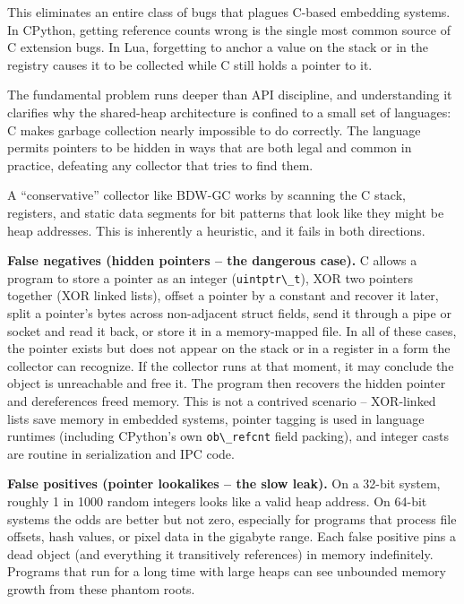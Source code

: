\documentclass[
  12pt,
]{report}
\newcommand{\passthrough}[1]{#1}
\begin{document}
This eliminates an entire class of bugs that plagues C-based embedding
systems. In CPython, getting reference counts wrong is the single most
common source of C extension bugs. In Lua, forgetting to anchor a value
on the stack or in the registry causes it to be collected while C still
holds a pointer to it.

The fundamental problem runs deeper than API discipline, and
understanding it clarifies why the shared-heap architecture is confined
to a small set of languages: C makes garbage collection nearly
impossible to do correctly. The language permits pointers to be hidden
in ways that are both legal and common in practice, defeating any
collector that tries to find them.

A ``conservative'' collector like BDW-GC works by scanning the C stack,
registers, and static data segments for bit patterns that look like they
might be heap addresses. This is inherently a heuristic, and it fails in
both directions.

\textbf{False negatives (hidden pointers -- the dangerous case).} C
allows a program to store a pointer as an integer
(\passthrough{\lstinline!uintptr\_t!}), XOR two pointers together (XOR
linked lists), offset a pointer by a constant and recover it later,
split a pointer's bytes across non-adjacent struct fields, send it
through a pipe or socket and read it back, or store it in a
memory-mapped file. In all of these cases, the pointer exists but does
not appear on the stack or in a register in a form the collector can
recognize. If the collector runs at that moment, it may conclude the
object is unreachable and free it. The program then recovers the hidden
pointer and dereferences freed memory. This is not a contrived scenario
-- XOR-linked lists save memory in embedded systems, pointer tagging is
used in language runtimes (including CPython's own
\passthrough{\lstinline!ob\_refcnt!} field packing), and integer casts
are routine in serialization and IPC code.

\textbf{False positives (pointer lookalikes -- the slow leak).} On a
32-bit system, roughly 1 in 1000 random integers looks like a valid heap
address. On 64-bit systems the odds are better but not zero, especially
for programs that process file offsets, hash values, or pixel data in
the gigabyte range. Each false positive pins a dead object (and
everything it transitively references) in memory indefinitely. Programs
that run for a long time with large heaps can see unbounded memory
growth from these phantom roots.
\end{document}

